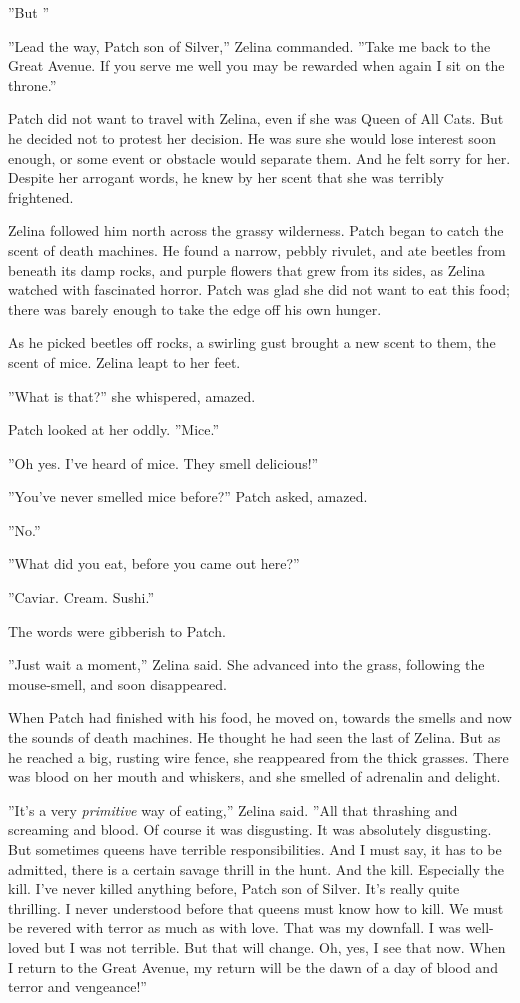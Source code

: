 \documentclass[11pt]{article}
\begin{document}
''But %
''\par
''Lead the way, Patch son of Silver,'' Zelina commanded. ''Take me back to the Great Avenue. If you serve me well you may be rewarded when again I sit on the throne.''\par
 Patch did not want to travel with Zelina, even if she was Queen of All Cats. But he decided not to protest her decision. He was sure she would lose interest soon enough, or some event or obstacle would separate them. And he felt sorry for her. Despite her arrogant words, he knew by her scent that she was terribly frightened.\par
 Zelina followed him north across the grassy wilderness. Patch began to catch the scent of death machines. He found a narrow, pebbly rivulet, and ate beetles from beneath its damp rocks, and purple flowers that grew from its sides, as Zelina watched with fascinated horror. Patch was glad she did not want to eat this food; there was barely enough to take the edge off his own hunger.\par
 As he picked beetles off rocks, a swirling gust brought a new scent to them, the scent of mice. Zelina leapt to her feet.\par
 ''What is that?'' she whispered, amazed.\par
 Patch looked at her oddly. ''Mice.''\par
 ''Oh yes. I've heard of mice. They smell delicious!''\par
 ''You've never smelled mice before?'' Patch asked, amazed.\par
 ''No.''\par
 ''What did you eat, before you came out here?''\par
 ''Caviar. Cream. Sushi.''\par
The words were gibberish to Patch.\par
''Just wait a moment,'' Zelina said. She advanced into the grass, following the mouse-smell, and soon disappeared.\par
 When Patch had finished with his food, he moved on, towards the smells and now the sounds of death machines. He thought he had seen the last of Zelina. But as he reached a big, rusting wire fence, she reappeared from the thick grasses. There was blood on her mouth and whiskers, and she smelled of adrenalin and delight.\par
 ''It's a very {\it primitive} way of eating,'' Zelina said. ''All that thrashing and screaming and blood. Of course it was disgusting. It was absolutely disgusting. But sometimes queens have terrible responsibilities. And I must say, it has to be admitted, there is a certain savage thrill in the hunt. And the kill. Especially the kill. I've never killed anything before, Patch son of Silver. It's really quite thrilling. I never understood before that queens must know how to kill. We must be revered with terror as much as with love. That was my downfall. I was well-loved but I was not terrible. But that will change. Oh, yes, I see that now. When I return to the Great Avenue, my return will be the dawn of a day of blood and terror and vengeance!''\par
\end{document}
